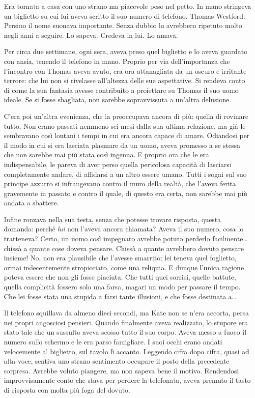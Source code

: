 \documentclass[a4paper,oneside,10pt]{memoir}
\begin{document}
Era tornata a casa con uno strano ma piacevole peso nel petto. In mano stringeva un biglietto su cui lui aveva scritto
il suo numero di telefono. Thomas Westford. Persino il nome suonava importante. Senza dubbio lo avrebbero ripetuto molto
negli anni a seguire. Lo sapeva. Credeva in lui. Lo amava.

Per circa due settimane, ogni sera, aveva preso quel biglietto e lo aveva guardato con ansia, tenendo il telefono in
mano. Proprio per via dell'importanza che l'incontro con Thomas aveva avuto, era ora attanagliata da un oscuro e
irritante terrore: che lui non si rivelasse all'altezza delle sue aspettative. Si rendeva conto di come la sua fantasia
avesse contribuito a proiettare su Thomas il suo uomo ideale. Se si fosse sbagliata, non sarebbe sopravvissuta a
un'altra delusione.

C'era poi un'altra evenienza, che la preoccupava ancora di più: quella di rovinare tutto. Non erano passati nemmeno sei
mesi dalla sua ultima relazione, ma già le sembravano così lontani i tempi in cui era ancora capace di amare. Odiandosi
per il modo in cui si era lasciata plasmare da un uomo, aveva promesso a se stessa che non sarebbe mai più stata così
ingenua. E proprio ora che le era indispensabile, le pareva di aver perso quella pericolosa capacità di lasciarsi
completamente andare, di affidarsi a un altro essere umano. Tutti i sogni sul suo principe azzurro si infrangevano
contro il muro della realtà, che l'aveva ferita gravemente in passato e contro il quale, di questo era certa, non
sarebbe mai più andata a sbattere.

Infine ronzava nella sua testa, senza che potesse trovare risposta, questa domanda: perché \emph{lui} non l'aveva ancora
chiamata? Aveva il suo numero, cosa lo tratteneva? Certo, un uomo così impegnato avrebbe potuto perderlo
facilmente\dots{} chissà a quante cose doveva pensare. Chissà a quante avrebbero dovuto pensare insieme! No, non era
plausibile che l'avesse smarrito: lei teneva quel foglietto, ormai indecentemente stropicciato, come una reliquia. E
dunque l'unica ragione poteva essere che non gli fosse piaciuta. Che tutti quei sorrisi, quelle battute, quella
complicità fossero solo una farsa, magari un modo per passare il tempo. Che lei fosse stata una stupida a farsi tante
illusioni, e che fosse destinata a\dots{}

Il telefono squillava da almeno dieci secondi, ma Kate non se n'era accorta, persa nei propri angosciosi pensieri.
Quando finalmente aveva realizzato, lo stupore era stato tale che un sussulto aveva scosso tutto il suo corpo. Aveva
messo a fuoco il numero sullo schermo e le era parso famigliare. I suoi occhi erano andati velocemente al biglietto, sul
tavolo lì accanto. Leggendo cifra dopo cifra, quasi ad alta voce, sentiva uno strano sentimento occupare il posto della
precedente sorpresa. Avrebbe voluto piangere, ma non sapeva bene il motivo. Rendendosi improvvisamente conto che stava
per perdere la telefonata, aveva premuto il tasto di risposta con molta più foga del dovuto.
\end{document}
